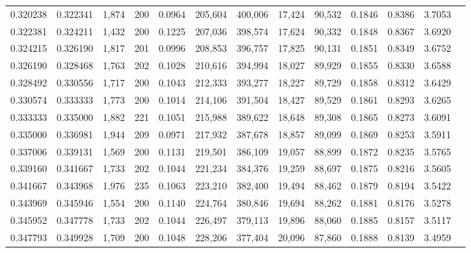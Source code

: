 \begin{tabular}{rrrrrrrrrrrrr}
0.320238 & 0.322341 &  1,874 &   200 &                                     0.0964 & 205,604 & 400,006 &  17,424 &  90,532 & 0.1846 & 0.8386 & 3.7053 \\
0.322381 & 0.324211 &  1,432 &   200 &                                     0.1225 & 207,036 & 398,574 &  17,624 &  90,332 & 0.1848 & 0.8367 & 3.6920 \\
0.324215 & 0.326190 &  1,817 &   201 &                                     0.0996 & 208,853 & 396,757 &  17,825 &  90,131 & 0.1851 & 0.8349 & 3.6752 \\
0.326190 & 0.328468 &  1,763 &   202 &                                     0.1028 & 210,616 & 394,994 &  18,027 &  89,929 & 0.1855 & 0.8330 & 3.6588 \\
0.328492 & 0.330556 &  1,717 &   200 &                                     0.1043 & 212,333 & 393,277 &  18,227 &  89,729 & 0.1858 & 0.8312 & 3.6429 \\
0.330574 & 0.333333 &  1,773 &   200 &                                     0.1014 & 214,106 & 391,504 &  18,427 &  89,529 & 0.1861 & 0.8293 & 3.6265 \\
0.333333 & 0.335000 &  1,882 &   221 &                                     0.1051 & 215,988 & 389,622 &  18,648 &  89,308 & 0.1865 & 0.8273 & 3.6091 \\
0.335000 & 0.336981 &  1,944 &   209 &                                     0.0971 & 217,932 & 387,678 &  18,857 &  89,099 & 0.1869 & 0.8253 & 3.5911 \\
0.337006 & 0.339131 &  1,569 &   200 &                                     0.1131 & 219,501 & 386,109 &  19,057 &  88,899 & 0.1872 & 0.8235 & 3.5765 \\
0.339160 & 0.341667 &  1,733 &   202 &                                     0.1044 & 221,234 & 384,376 &  19,259 &  88,697 & 0.1875 & 0.8216 & 3.5605 \\
0.341667 & 0.343968 &  1,976 &   235 &                                     0.1063 & 223,210 & 382,400 &  19,494 &  88,462 & 0.1879 & 0.8194 & 3.5422 \\
0.343969 & 0.345946 &  1,554 &   200 &                                     0.1140 & 224,764 & 380,846 &  19,694 &  88,262 & 0.1881 & 0.8176 & 3.5278 \\
0.345952 & 0.347778 &  1,733 &   202 &                                     0.1044 & 226,497 & 379,113 &  19,896 &  88,060 & 0.1885 & 0.8157 & 3.5117 \\
0.347793 & 0.349928 &  1,709 &   200 &                                     0.1048 & 228,206 & 377,404 &  20,096 &  87,860 & 0.1888 & 0.8139 & 3.4959 \\

\end{tabular}
